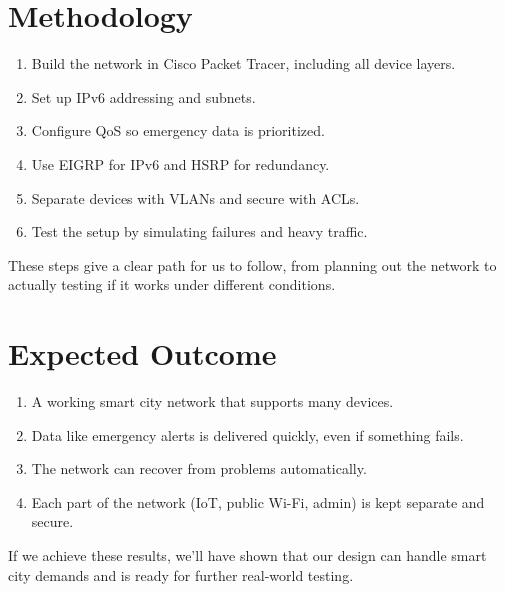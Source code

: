 \documentclass[12pt,a4paper]{article}
\begin{document}
\vspace{1em}

\section*{Methodology}
\begin{enumerate}[label=6.\arabic*, nosep]
    \item Build the network in Cisco Packet Tracer, including all device layers.
    \item Set up IPv6 addressing and subnets.
    \item Configure QoS so emergency data is prioritized.
    \item Use EIGRP for IPv6 and HSRP for redundancy.
    \item Separate devices with VLANs and secure with ACLs.
    \item Test the setup by simulating failures and heavy traffic.
\end{enumerate}
These steps give a clear path for us to follow, from planning out the network to actually testing if it works under different conditions.

\newpage

\section*{Expected Outcome}
\begin{enumerate}[label=7.\arabic*, nosep]
    \item A working smart city network that supports many devices.
    \item Data like emergency alerts is delivered quickly, even if something fails.
    \item The network can recover from problems automatically.
    \item Each part of the network (IoT, public Wi-Fi, admin) is kept separate and secure.
\end{enumerate}
If we achieve these results, we’ll have shown that our design can handle smart city demands and is ready for further real-world testing.

\vspace{1em}

\end{document}
